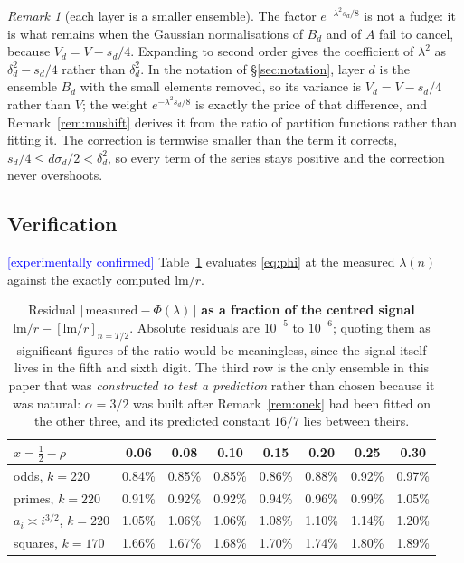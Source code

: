 \documentclass[11pt,a4paper]{article}
\theoremstyle{plain}
\theoremstyle{definition}
\theoremstyle{remark}
\newtheorem{remark}[theorem]{Remark}
\newcommand{\lm}{\mathrm{lm}}
\newcommand{\STATUS}[1]{\textcolor{blue}{\textsf{[#1]}}}
\begin{document}
\begin{remark}[each layer is a smaller ensemble]\label{rem:weight}
The factor $e^{-\lambda^2 s_d/8}$ is not a fudge: it is what remains when the Gaussian
normalisations of $B_d$ and of $A$ fail to cancel, because $V_d=V-s_d/4$. Expanding to second
order gives the coefficient of $\lambda^2$ as $\delta_d^2-s_d/4$ rather than $\delta_d^2$.
In the notation of \S\ref{sec:notation}, layer $d$ is the ensemble $B_d$ with the small
elements removed, so its variance is $V_d=V-s_d/4$ rather than $V$; the weight
$e^{-\lambda^{2}s_d/8}$ is exactly the price of that difference, and
Remark~\ref{rem:mushift} derives it from the ratio of partition functions rather than
fitting it. The correction is termwise smaller than the term it corrects,
$s_d/4\le d\sigma_d/2<\delta_d^{2}$, so every term of the series stays positive and the
correction never overshoots.
\end{remark}

\subsection{Verification}\label{sec:table1}

\STATUS{experimentally confirmed} Table~\ref{tab:one} evaluates \eqref{eq:phi} at the measured
$\lambda(n)$ against the exactly computed $\lm/r$.

\begin{table}[htbp]
\centering
\small
\begin{tabular}{lccccccc}
\toprule
$x=\frac12-\rho$ & 0.06 & 0.08 & 0.10 & 0.15 & 0.20 & 0.25 & 0.30\\
\midrule
odds, $k=220$      & 0.84\% & 0.85\% & 0.85\% & 0.86\% & 0.88\% & 0.92\% & 0.97\%\\
primes, $k=220$    & 0.91\% & 0.92\% & 0.92\% & 0.94\% & 0.96\% & 0.99\% & 1.05\%\\
$a_i\asymp i^{3/2}$, $k=220$ & 1.05\% & 1.06\% & 1.06\% & 1.08\% & 1.10\% & 1.14\% & 1.20\%\\
squares, $k=170$   & 1.66\% & 1.67\% & 1.68\% & 1.70\% & 1.74\% & 1.80\% & 1.89\%\\
\bottomrule
\end{tabular}
\caption{Residual $|\,\mathrm{measured}-\Phi(\lambda)\,|$ \textbf{as a fraction of the centred
signal} $\lm/r-[\lm/r]_{n=T/2}$. Absolute residuals are $10^{-5}$ to $10^{-6}$; quoting
them as significant figures of the ratio would be meaningless, since the signal itself lives in
the fifth and sixth digit. The third row is the only ensemble in this paper that was
\emph{constructed to test a prediction} rather than chosen because it was natural: $\alpha=3/2$
was built after Remark~\ref{rem:onek} had been fitted on the other three, and its predicted
constant $16/7$ lies between theirs.}
\label{tab:one}
\end{table}
\end{document}

